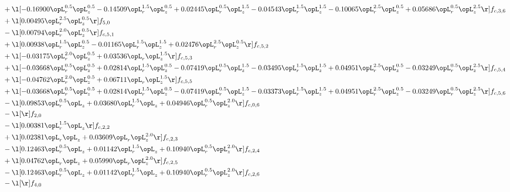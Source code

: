 \begin{alignat}{2}
& + \l[  -0.16900 \opL_r^{0.5} \opL_z^{0.5}   -0.14509 \opL_r^{1.5} \opL_z^{0.5} +  0.02445 \opL_r^{0.5} \opL_z^{1.5}   -0.04543 \opL_r^{1.5} \opL_z^{1.5}   -0.10065 \opL_r^{2.5} \opL_z^{0.5} +  0.05686 \opL_r^{0.5} \opL_z^{2.5}  \r] f_{c,3,6} \nonumber \\ 
& + \l[  0.00495 \opL_r^{2.5} \opL_z^{0.5}  \r] f_{5,0} \nonumber \\ 
& - \l[  0.00794 \opL_r^{2.0} \opL_z^{0.5}  \r] f_{c,5,1} \nonumber \\ 
& + \l[  0.00938 \opL_r^{1.5} \opL_z^{0.5}   -0.01165 \opL_r^{1.5} \opL_z^{1.5} +  0.02476 \opL_r^{2.5} \opL_z^{0.5}  \r] f_{c,5,2} \nonumber \\ 
& + \l[  -0.03175 \opL_r^{2.0} \opL_z^{0.5} +  0.03536 \opL_r \opL_z^{1.5}  \r] f_{c,5,3} \nonumber \\ 
& + \l[  -0.03668 \opL_r^{0.5} \opL_z^{0.5} +  0.02814 \opL_r^{1.5} \opL_z^{0.5}   -0.07419 \opL_r^{0.5} \opL_z^{1.5}   -0.03495 \opL_r^{1.5} \opL_z^{1.5} +  0.04951 \opL_r^{2.5} \opL_z^{0.5}   -0.03249 \opL_r^{0.5} \opL_z^{2.5}  \r] f_{c,5,4} \nonumber \\ 
& + \l[  -0.04762 \opL_r^{2.0} \opL_z^{0.5} +  0.06711 \opL_r \opL_z^{1.5}  \r] f_{c,5,5} \nonumber \\ 
& + \l[  -0.03668 \opL_r^{0.5} \opL_z^{0.5} +  0.02814 \opL_r^{1.5} \opL_z^{0.5}   -0.07419 \opL_r^{0.5} \opL_z^{1.5}   -0.03373 \opL_r^{1.5} \opL_z^{1.5} +  0.04951 \opL_r^{2.5} \opL_z^{0.5}   -0.03249 \opL_r^{0.5} \opL_z^{2.5}  \r] f_{c,5,6} \nonumber \\ 
& - \l[  0.09853 \opL_r^{0.5} \opL_z +  0.03680 \opL_r^{1.5} \opL_z +  0.04946 \opL_r^{0.5} \opL_z^{2.0}  \r] f_{c,0,6} \nonumber \\ 
& - \l[  \r] f_{2,0} \nonumber \\ 
& - \l[  0.00381 \opL_r^{1.5} \opL_z  \r] f_{c,2,2} \nonumber \\ 
& + \l[  0.02381 \opL_r \opL_z +  0.03609 \opL_r \opL_z^{2.0}  \r] f_{c,2,3} \nonumber \\ 
& - \l[  0.12463 \opL_r^{0.5} \opL_z +  0.01142 \opL_r^{1.5} \opL_z +  0.10940 \opL_r^{0.5} \opL_z^{2.0}  \r] f_{c,2,4} \nonumber \\ 
& + \l[  0.04762 \opL_r \opL_z +  0.05990 \opL_r \opL_z^{2.0}  \r] f_{c,2,5} \nonumber \\ 
& - \l[  0.12463 \opL_r^{0.5} \opL_z +  0.01142 \opL_r^{1.5} \opL_z +  0.10940 \opL_r^{0.5} \opL_z^{2.0}  \r] f_{c,2,6} \nonumber \\ 
& - \l[  \r] f_{4,0} \nonumber \\ 

\end{alignat}
